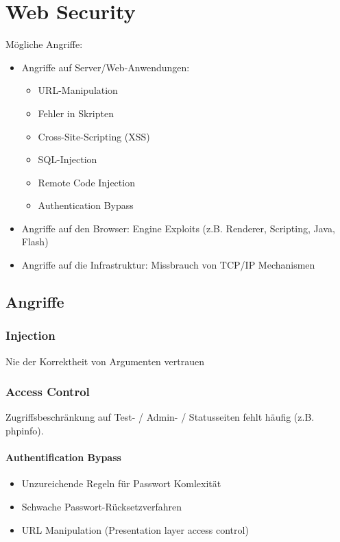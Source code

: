 \chapter{Web Security}
Mögliche Angriffe:
\begin{itemize}
    \item Angriffe auf Server/Web-Anwendungen:
        \begin{itemize}
            \item URL-Manipulation
            \item Fehler in Skripten
            \item Cross-Site-Scripting (XSS)
            \item SQL-Injection
            \item Remote Code Injection
            \item Authentication Bypass
        \end{itemize}
    \item Angriffe auf den Browser: Engine Exploits (z.B. Renderer, Scripting, Java, Flash)
    \item Angriffe auf die Infrastruktur: Missbrauch von TCP/IP Mechanismen
\end{itemize}

\section{Angriffe}
\subsection{Injection}
Nie der Korrektheit von Argumenten vertrauen

\subsection{Access Control}
Zugriffsbeschränkung auf Test- / Admin- / Statusseiten fehlt häufig (z.B. phpinfo).

\subsubsection{Authentification Bypass}
\begin{itemize}
    \item Unzureichende Regeln für Passwort Komlexität
    \item Schwache Passwort-Rücksetzverfahren
    \item URL Manipulation (Presentation layer access control)
\end{itemize}

